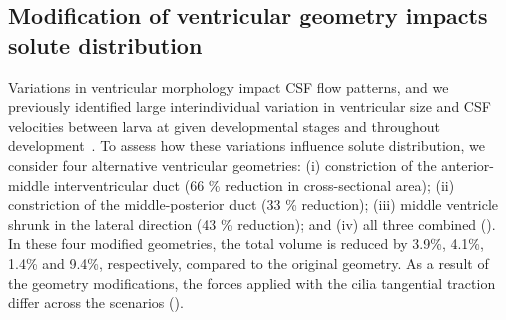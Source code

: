 \documentclass{WileyMSP-template}
\begin{document}
\subsection{Modification of ventricular geometry impacts solute distribution}
Variations in ventricular morphology impact CSF flow
patterns, and we previously identified large
interindividual variation in ventricular size and
CSF velocities between larva at given developmental stages and throughout
development~\cite{Olstad2019CiliaryDevelopment, DGama2025MotileBrain, Jeong2024TheZebrafish}.
To assess how these
variations influence solute distribution, we consider four alternative
ventricular geometries: (i) constriction of the anterior-middle
interventricular duct (66 \% reduction in cross-sectional area);
(ii) constriction of the middle-posterior duct (33 \% reduction);
(iii) middle ventricle shrunk in the lateral direction (43 \% reduction);
and (iv) all three combined ().
In these four modified geometries, the total volume is reduced by
3.9\%, 4.1\%, 1.4\% and 9.4\%, respectively, compared to the original
geometry. As a result of the geometry modifications,
the forces applied with the 
cilia tangential traction differ across the scenarios
().
\end{document}
